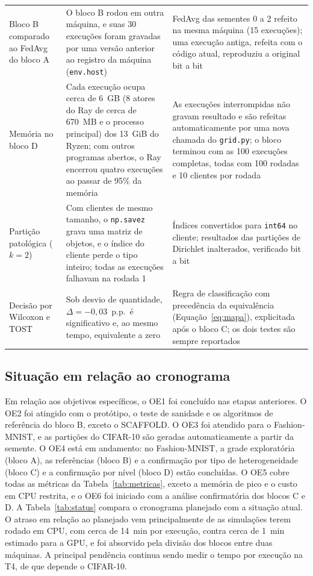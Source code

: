 \begin{table}[t]
\begin{tabular}{@{}p{3.6cm}p{6.3cm}p{6.4cm}@{}}
        Bloco B comparado ao FedAvg do bloco A & O bloco B rodou em outra máquina, e suas 30 execuções foram gravadas por uma versão anterior ao registro da máquina (\texttt{env.host}) & FedAvg das sementes 0 a 2 refeito na mesma máquina (15 execuções); uma execução antiga, refeita com o código atual, reproduziu a original bit a bit \\
        Memória no bloco D & Cada execução ocupa cerca de 6~GB (8 atores do Ray de cerca de 670~MB e o processo principal) dos 13~GiB do Ryzen; com outros programas abertos, o Ray encerrou quatro execuções ao passar de 95\% da memória & As execuções interrompidas não gravam resultado e são refeitas automaticamente por uma nova chamada do \texttt{grid.py}; o bloco terminou com as 100 execuções completas, todas com 100 rodadas e 10 clientes por rodada \\
        Partição patológica ($k = 2$) & Com clientes de mesmo tamanho, o \texttt{np.savez} grava uma matriz de objetos, e o índice do cliente perde o tipo inteiro; todas as execuções falhavam na rodada 1 & Índices convertidos para \texttt{int64} no cliente; resultados das partições de Dirichlet inalterados, verificado bit a bit \\
        Decisão por Wilcoxon e TOST & Sob desvio de quantidade, $\Delta = -0{,}03$~p.p.\ é significativo e, ao mesmo tempo, equivalente a zero & Regra de classificação com precedência da equivalência (Equação~\eqref{eq:mapa}), explicitada após o bloco C; os dois testes são sempre reportados \\
        \bottomrule
    \end{tabular}
\end{table}

\subsection{Situação em relação ao cronograma}

Em relação aos objetivos específicos, o OE1 foi concluído nas etapas anteriores. O OE2 foi atingido com o protótipo, o teste de sanidade e os algoritmos de referência do bloco B, exceto o SCAFFOLD. O OE3 foi atendido para o Fashion-MNIST, e as partições do CIFAR-10 são geradas automaticamente a partir da semente. O OE4 está em andamento: no Fashion-MNIST, a grade exploratória (bloco A), as referências (bloco B) e a confirmação por tipo de heterogeneidade (bloco C) e a confirmação por nível (bloco D) estão concluídas. O OE5 cobre todas as métricas da Tabela~\ref{tab:metricas}, exceto a memória de pico e o custo em CPU restrita, e o OE6 foi iniciado com a análise confirmatória dos blocos C e D. A Tabela~\ref{tab:status} compara o cronograma planejado com a situação atual. O atraso em relação ao planejado vem principalmente de as simulações terem rodado em CPU, com cerca de 14~min por execução, contra cerca de 1~min estimado para a GPU, e foi absorvido pela divisão dos blocos entre duas máquinas. A principal pendência continua sendo medir o tempo por execução na T4, de que depende o CIFAR-10.

